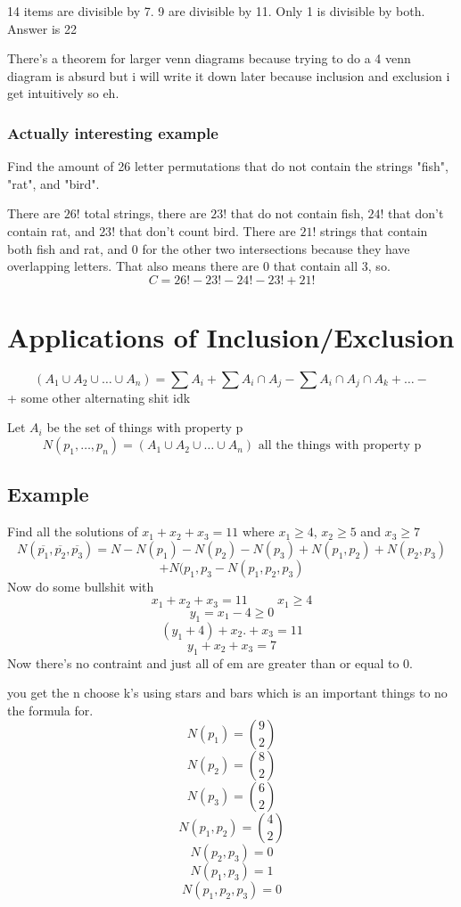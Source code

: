 \documentclass{report}
\newcommand{\hp}{\hspace{1cm}}
\begin{document}
14 items are divisible by 7. 9 are divisible by 11. Only 1 is divisible by both. Answer is 22

There's a theorem for larger venn diagrams because trying to do a 4 venn diagram is absurd but i will write it down later because inclusion and exclusion i get intuitively so eh.

\subsection*{Actually interesting example}
Find the amount of 26 letter permutations that do not contain the strings "fish", "rat", and "bird".

There are $26!$ total strings, there are $23!$ that do not contain fish, $24!$ that don't contain rat, and $23!$ that don't count bird. There are $21!$ strings that contain both fish and rat, and 0 for the other two intersections because they have overlapping letters. That also means there are 0 that contain all 3, so.
\[
C = 26! - 23! -24! - 23! + 21!
\]



\chapter{Applications of Inclusion/Exclusion}
\[
(A_1 \cup A_2 \cup \ldots \cup A_n) 
= 
\sum A_i 
+ 
\sum A_i \cap A_j 
-
\sum A_i \cap A_j \cap A_k 
+ 
\ldots
-
\]
+ some other alternating shit idk

Let $A_i$ be the set of things with property p
\[
N(p_1, \ldots , p_n)
=
(A_1 \cup A_2 \cup \ldots \cup A_n)
\textrm{ all the things with property p}
\]

\section{Example}
Find all the solutions of $x_1 + x_2 + x_3 = 11$ where $x_1 \geq 4$, $x_2 \geq 5$ and $x_3  \geq 7$
\[
N(\overline{p_1}, \overline{p_2}, \overline{p_3})
=
N - N(p_1) - N(p_2) - N(p_3) + N(p_1, p_2) + N(p_2, p_3)
\]
\[
 + N(p_1, p_3 - N(p_1, p_2, p_3)
\]
Now do some bullshit with
\[
x_1 + x_2 + x_3 = 11 
\hp
x_1 \geq 4
\]
\[
y_1 = x_1 - 4 \geq 0
\]
\[
(y_1 + 4) + x_2. + x_3 = 11
\]
\[
y_1 + x_2 + x_3 = 7
\]
Now there's no contraint and just all of em are greater than or equal to 0.

you get the n choose k's using stars and bars which is an important things to no the formula for.
\[
N(p_1) = {9 \choose 2}
\]
\[
N(p_2) = {8 \choose 2}
\]
\[
N(p_3) = {6 \choose 2}
\]
\[
N(p_1, p_2) = {4 \choose 2}
\]
\[
N(p_2, p_3) = 0
\]
\[
N(p_1, p_3) = 1
\]
\[
N(p_1, p_2, p_3) = 0
\]
\end{document}
